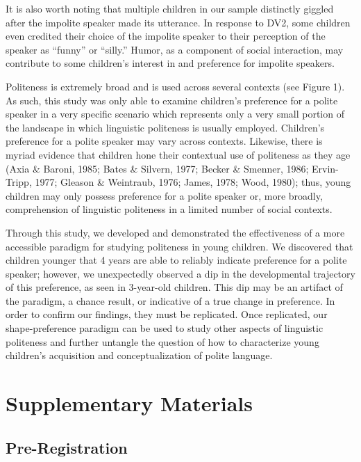 \documentclass[
  english,
  man,floatsintext]{apa6}
\begin{document}
It is also worth noting that multiple children in our sample distinctly giggled after the impolite speaker made its utterance. In response to DV2, some children even credited their choice of the impolite speaker to their perception of the speaker as ``funny'' or ``silly.'' Humor, as a component of social interaction, may contribute to some children's interest in and preference for impolite speakers.

Politeness is extremely broad and is used across several contexts (see Figure 1). As such, this study was only able to examine children's preference for a polite speaker in a very specific scenario which represents only a very small portion of the landscape in which linguistic politeness is usually employed. Children's preference for a polite speaker may vary across contexts. Likewise, there is myriad evidence that children hone their contextual use of politeness as they age (Axia \& Baroni, 1985; Bates \& Silvern, 1977; Becker \& Smenner, 1986; Ervin-Tripp, 1977; Gleason \& Weintraub, 1976; James, 1978; Wood, 1980); thus, young children may only possess preference for a polite speaker or, more broadly, comprehension of linguistic politeness in a limited number of social contexts.

Through this study, we developed and demonstrated the effectiveness of a more accessible paradigm for studying politeness in young children. We discovered that children younger that 4 years are able to reliably indicate preference for a polite speaker; however, we unexpectedly observed a dip in the developmental trajectory of this preference, as seen in 3-year-old children. This dip may be an artifact of the paradigm, a chance result, or indicative of a true change in preference. In order to confirm our findings, they must be replicated. Once replicated, our shape-preference paradigm can be used to study other aspects of linguistic politeness and further untangle the question of how to characterize young children's acquisition and conceptualization of polite language.

\hypertarget{supplementary-materials}{%
\section{Supplementary Materials}\label{supplementary-materials}}

\hypertarget{pre-registration}{%
\subsection{Pre-Registration}\label{pre-registration}}
\end{document}
